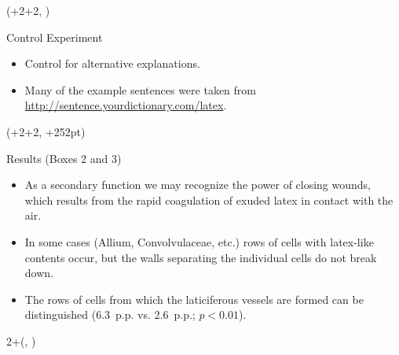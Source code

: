 \documentclass{beamer}
\newlength{\blockThree}
\newlength{\blockFour}
\newcommand{\mynum}[1]{\scalebox{1.075}{\firasemibold#1}}
\begin{document}
\begin{frame}[t]
\begin{textblock*}{\colwidth}
\end{textblock*}




\begin{textblock*}{\colwidth}(\leftmargin+2\colwidth+2\colsep, \blockThree)
\begin{block}{Control Experiment}
\vspace{-0.333333\baselineskip}
\newlength{\disckern}
\setlength{\disckern}{1pt}
\begin{itemize} \justifying
	\item Control for alternative explanations.
	\item Many of the example sentences were taken from \url{http://sentence.yourdictionary.com/latex}.
\end{itemize}
\end{block}

\end{textblock*}




\begin{textblock*}{\colwidth}(\leftmargin+2\colwidth+2\colsep, \blockThree+252pt)

\begin{block}{Results {\mdseries(Boxes 2 and 3)}}
\vspace{-0.333333\baselineskip}
\begin{itemize} \justifying
	\item[\mynum{1}] As a secondary function we may recognize the power of closing wounds, which results from the rapid coagulation of exuded latex in contact with the air.
	\item[\mynum{2}] In some cases (Allium, Convolvulaceae, etc.) rows of cells with latex-like contents occur, but the walls separating the individual cells do not break down.
	\item[\mynum{3}] The rows of cells from which the laticiferous vessels are formed can be distinguished (6.3~p.p. vs. 2.6~p.p.; ${p < 0.01}$).
\end{itemize}
\end{block}

\end{textblock*}




\begin{textblock*}{2\colwidth+\colsep}(\leftmargin, \blockFour)


\end{textblock*}
\end{frame}
\end{document}
